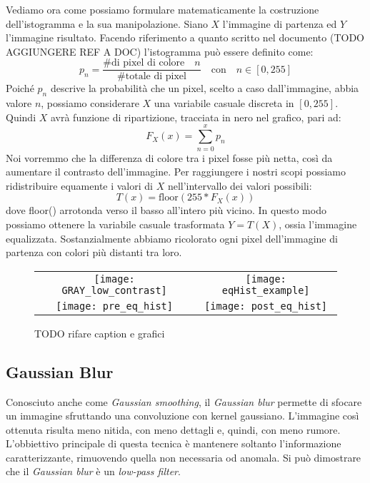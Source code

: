 Vediamo ora come possiamo formulare matematicamente la costruzione dell'istogramma e la sua manipolazione.
Siano $X$ l'immagine di partenza ed $Y$ l'immagine risultato.
Facendo riferimento a quanto scritto nel documento (TODO AGGIUNGERE REF A DOC) l'istogramma può essere definito come:
\begin{equation*}
p_n = \frac{\text{\# di pixel di colore} \quad n}{\text{\# totale di pixel}} \quad \text{con} \quad n \in [0,255]
\end{equation*}
Poiché $p_n$ descrive la probabilità che un pixel, scelto a caso dall'immagine, abbia valore $n$, possiamo considerare $X$ una variabile casuale discreta in $[0,255]$.
Quindi $X$ avrà funzione di ripartizione, tracciata in nero nel grafico, pari ad:
\begin{equation*}
  F_X(x) = \sum_{n=0}^{x} p_n
\end{equation*}
Noi vorremmo che la differenza di colore tra i pixel fosse più netta, così da aumentare il contrasto dell'immagine.
Per raggiungere i nostri scopi possiamo ridistribuire equamente i valori di $X$ nell'intervallo dei valori possibili:
\begin{equation*}
  T(x) = \text{floor}(255 * F_X(x))
\end{equation*}
dove floor() arrotonda verso il basso all'intero più vicino.
In questo modo possiamo ottenere la variabile casuale trasformata $Y=T(X)$, ossia l'immagine equalizzata.
Sostanzialmente abbiamo ricolorato ogni pixel dell'immagine di partenza con colori più distanti tra loro.

\begin{figure}[ht] %
  \begin{center}
    \begin{tabular}{cc}
      \texttt{[image: GRAY\_low\_contrast]} &
      \texttt{[image: eqHist\_example]} \\
      \texttt{[image: pre\_eq\_hist]} &
      \texttt{[image: post\_eq\_hist]}
    \end{tabular}
    \label{fig:hist_eq_example}
    \caption{TODO rifare caption e grafici}
  \end{center}
\end{figure}



\clearpage
\subsection {Gaussian Blur}
Conosciuto anche come \textit{Gaussian smoothing}, il \textit{Gaussian blur} permette di sfocare un immagine sfruttando una convoluzione con kernel gaussiano.
L'immagine così ottenuta risulta meno nitida, con meno dettagli e, quindi, con meno rumore.
L'obbiettivo principale di questa tecnica è mantenere soltanto l'informazione caratterizzante, rimuovendo quella non necessaria od anomala.
Si può dimostrare che il \textit{Gaussian blur} è un \textit{low-pass filter}.

